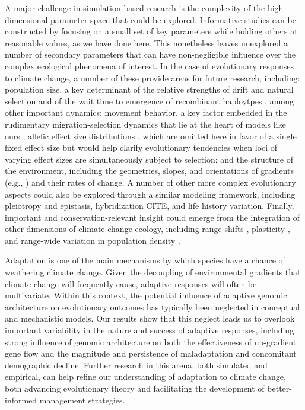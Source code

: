 \documentclass[9pt,twocolumn,twoside,lineno]{pnas-new}
\begin{document}
A major challenge in simulation-based research is the complexity of the high-dimensional 
parameter space that could be explored.
Informative studies can be constructed by focusing on a small set of
key parameters while holding others at reasonable values, as we have done here.
This nonetheless leaves unexplored a number of secondary parameters
that can have non-negligible influence over the complex ecological phenomena of interest.
In the case of evolutionary responses to climate change,
a number of these provide areas for future research, including:
population size, a key determinant of the relative strengths of drift
and natural selection \cite{murray} and of the wait time to emergence of
recombinant haploytpes \cite{christiansen}, among other important dynamics;
movement behavior, a key factor embedded in the rudimentary
migration-selection dynamics that lie at the heart of models like ours
\cite{wright,haldane,barton};
allelic effect size distributions \cite{orr},
which are omitted here in favor of a single fixed effect size but would
help clarify evolutionary tendencies when loci of varying effect sizes
are simultaneously subject to selection;
and the structure of the environment,
including the geometries, slopes, and orientations of gradients
(e.g., \cite{benes}) and their rates of change.
A number of other more complex evolutionary aspects could also be explored 
through a similar modeling framework, including 
pleiotropy \cite{thompson} and epistasis,
hybridization CITE, and life history variation.
Finally, important and conservation-relevant insight could emerge from the 
integration of other dimensions of climate change ecology, including range shifts 
\cite{weiss-lehman}, plasticity \cite{chevin},
and range-wide variation in population density \cite{aitken_whitlock}.

Adaptation is one of the main mechanisms by which species
have a chance of weathering climate change.
Given the decoupling of environmental gradients that
climate change will frequently cause,
adaptive responses will often be multivariate.
Within this context, the potential influence of adaptive genomic architecture
on evolutionary outcomes has typically been neglected in conceptual and mechanistic models.
Our results show that this neglect leads
us to overlook important variability in the nature
and success of adaptive responses,
including strong influence of genomic architecture
on both the effectiveness
of up-gradient gene flow and the magnitude and persistence
of maladaptation and concomitant demographic decline.
Further research in this arena, both simulated and empirical,
can help refine our understanding of adaptation to climate change,
both advancing evolutionary theory
and facilitating the development of better-informed management strategies.
\end{document}

